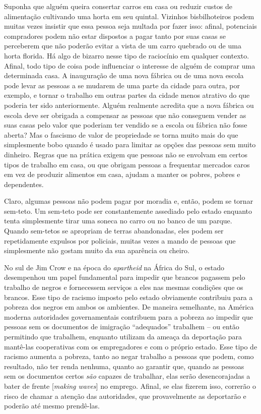 Suponha que alguém queira consertar carros em casa ou reduzir custos de alimentação cultivando uma horta em seu quintal. Vizinhos bisbilhoteiros podem muitas vezes insistir que essa pessoa seja multada por fazer isso: afinal, potenciais compradores podem não estar dispostos a pagar tanto por suas casas se perceberem que não poderão evitar a vista de um carro quebrado ou de uma horta florida. Há algo de bizarro nesse tipo de raciocínio em qualquer contexto. Afinal, todo tipo de coisa pode influenciar o interesse de alguém de comprar uma determinada casa. A inauguração de uma nova fábrica ou de uma nova escola pode levar as pessoas a se mudarem de uma parte da cidade para outra, por exemplo, e tornar o trabalho em outras partes da cidade menos atrativo do que poderia ter sido anteriormente. Alguém realmente acredita que a nova fábrica ou escola deve ser obrigada a compensar as pessoas que não conseguem vender as suas casas pelo valor que poderiam ter vendido se a escola ou fábrica não fosse aberta? Mas o fascismo de valor de propriedade se torna muito mais do que simplesmente bobo quando é usado para limitar as opções das pessoas sem muito dinheiro. Regras que na prática exigem que pessoas não se envolvam em certos tipos de trabalho em casa, ou que obrigam pessoas a frequentar mercados caros em vez de produzir alimentos em casa, ajudam a manter os pobres, pobres e dependentes.

Claro, algumas pessoas não podem pagar por moradia e, então, podem se tornar sem-teto. Um sem-teto pode ser constantemente assediado pelo estado enquanto tenta simplesmente tirar uma soneca no carro ou no banco de um parque. Quando sem-tetos se apropriam de terras abandonadas, eles podem ser repetidamente expulsos por policiais, muitas vezes a mando de pessoas que simplesmente não gostam muito da sua aparência ou cheiro.

No sul de Jim Crow e na época do \emph{apartheid} na África do Sul, o estado desempenhou um papel fundamental para impedir que brancos pagassem pelo trabalho de negros e fornecessem serviços a eles nas mesmas condições que os brancos. Esse tipo de racismo imposto pelo estado obviamente contribuiu para a pobreza dos negros em ambos os ambientes. De maneira semelhante, na América moderna autoridades governamentais contribuem para a pobreza ao impedir que pessoas sem os documentos de imigração ``adequados'' trabalhem -- ou então permitindo que trabalhem, enquanto utilizam da ameaça da deportação para mantê-las cooperativas com os empregadores e com o próprio estado. Esse tipo de racismo aumenta a pobreza, tanto ao negar trabalho a pessoas que podem, como resultado, não ter renda nenhuma, quanto ao garantir que, quando as pessoas sem os documentos certos \emph{são} capazes de trabalhar, elas serão desencorajadas a bater de frente [\emph{making waves}] no emprego. Afinal, se elas fizerem isso, correrão o risco de chamar a atenção das autoridades, que provavelmente as deportarão e poderão até mesmo prendê-las. 

